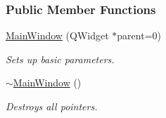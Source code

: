 \subsubsection*{Public Member Functions}
\begin{DoxyCompactItemize}
\item 
\hyperlink{classMainWindow_a8b244be8b7b7db1b08de2a2acb9409db}{Main\+Window} (Q\+Widget $\ast$parent=0)
\begin{DoxyCompactList}\small\item\em Sets up basic parameters. \end{DoxyCompactList}\item 
\hyperlink{classMainWindow_ae98d00a93bc118200eeef9f9bba1dba7}{$\sim$\+Main\+Window} ()
\begin{DoxyCompactList}\small\item\em Destroys all pointers. \end{DoxyCompactList}\end{DoxyCompactItemize}
